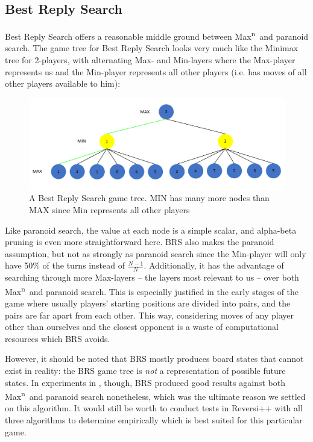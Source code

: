 \documentclass[a4paper,12pt]{article}
\newcommand{\Maxn}{Max\textsuperscript{n}\ }
\begin{document}
\subsection{Best Reply Search}
Best Reply Search \cite{best-reply-search} offers a reasonable middle ground between \Maxn and paranoid search. The game tree for Best Reply Search looks very much like the Minimax tree for 2-players, with alternating Max- and Min-layers where the Max-player represents us and the Min-player represents all other players (i.e. has moves of all other players available to him):

\begin{figure}[H]
    \centering
    \includegraphics[width=\textwidth,keepaspectratio]{pictures/assignment3/BRSTree.png}
    \caption{A Best Reply Search game tree. MIN has many more nodes than MAX since Min represents all other players}
\end{figure}

Like paranoid search, the value at each node is a simple scalar, and alpha-beta pruning is even more straightforward here. BRS also makes the paranoid assumption, but not as strongly as paranoid search since the Min-player will only have 50\% of the turns instead of $\frac{N-1}{N}$. Additionally, it has the advantage of searching through more Max-layers -- the layers most relevant to us -- over both \Maxn and paranoid search. This is especially justified in the early stages of the game where usually players' starting positions are divided into pairs, and the pairs are far apart from each other. This way, considering moves of any player other than ourselves and the closest opponent is a waste of computational resources which BRS avoids.

However, it should be noted that BRS mostly produces board states that cannot exist in reality: the BRS game tree is \emph{not} a representation of possible future states. In experiments in \cite{best-reply-search}, though, BRS produced good results against both \Maxn and paranoid search nonetheless, which was the ultimate reason we settled on this algorithm. It would still be worth to conduct tests in Reversi++ with all three algorithms to determine empirically which is best suited for this particular game.
\end{document}

